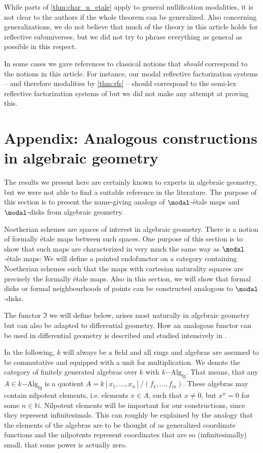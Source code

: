 \documentclass{msc}
\newcommand{\bN}{\mathbb N}
\begin{document}
While parts of \cref{thm:char_n_etale} apply to general nullification modalities,
it is not clear to the authors if the whole theorem can be generalized.
Also concerning generalizations, we do not believe that much of the theory in this article holds for reflective subuniverses,
but we did not try to phrase everything as general as possible in this respect.

In some cases we gave references to classical notions that \emph{should} correspond to the notions in this article.
For instance, our modal reflective factorization systems -- and therefore modalities by \cref{thm:rfs} --
should correspond to the semi-lex reflective factorization systems of \cite{cassidy_hebert_kelly_1985}
but we did not make any attempt at proving this.


\section*{Appendix: Analogous constructions in algebraic geometry}
\label{subsection:algebraic geometry}
The results we present here are certainly known to experts in algebraic geometry,
but we were not able to find a suitable reference in the literature.
The purpose of this section is to present the name-giving analogs of $\modal$-étale maps and $\modal$-disks from algebraic geometry.

Noetherian schemes are spaces of interest in algebraic geometry. There is a notion of formally étale maps between such spaces.
One purpose of this section is to show that such maps are characterized in very much the same way as $\modal$-étale maps:
We will define a pointed endofunctor on a category containing Noetherian schemes
such that the maps with cartesian naturality squares are precisely the formally étale maps.
Also in this section, we will show that formal disks or formal neighbourhoods of points can be constructed analogous to $\modal$-disks.

The functor $\Im$ we will define below, arises most naturally in algebraic geometry but can also be adapted to differential geometry.
How an analogous functor can be used in differential geometry is described and studied intensively in \cite{SyntheticPDEs}.

In the following, $k$ will always be a field and all rings and algebras are assumed to be commutative and equipped with a unit for multiplication.
We denote the category of finitely generated algebras over $k$ with $k\mathrm{-Alg}_{\mathrm{fg}}$.
That means, that any $A\in k\mathrm{-Alg}_{\mathrm{fg}}$ is a quotient $A=k[x_1,\dots,x_n]/(f_1,\dots,f_m)$.
These algebras may contain nilpotent elements, i.e. elements $x\in A$, such that $x\neq 0$, but $x^n=0$ for some $n\in\bN$.
Nilpotent elements will be important for our constructions, since they represent infinitesimals.
This can roughly be explained by the analogy
that the elements of the algebras are to be thought of as generalized coordinate functions
and the nilpotents represent coordinates that are so (infinitesimally) small, that some power is actually zero. 
\end{document}
